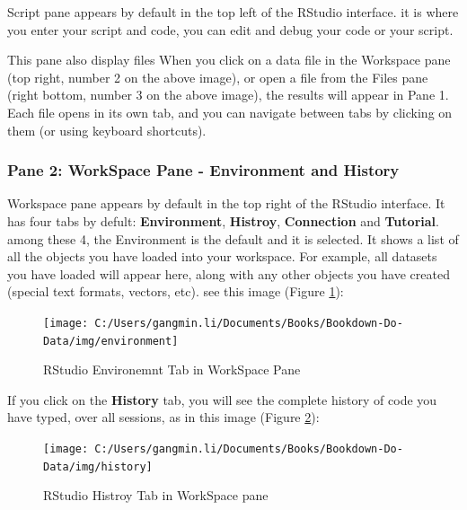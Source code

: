 \documentclass[
]{book}
\begin{document}
Script pane appears by default in the top left of the RStudio interface. it is where you enter your script and code, you can edit and debug your code or your script.

This pane also display files When you click on a data file in the Workspace pane (top right, number 2 on the above image), or open a file from the Files pane (right bottom, number 3 on the above image), the results will appear in Pane 1. Each file opens in its own tab, and you can navigate between tabs by clicking on them (or using keyboard shortcuts).

\hypertarget{pane-2-workspace-pane---environment-and-history}{%
\subsubsection*{Pane 2: WorkSpace Pane - Environment and History}\label{pane-2-workspace-pane---environment-and-history}}


Workspace pane appears by default in the top right of the RStudio interface. It has four tabs by defult: \textbf{Environment}, \textbf{Histroy}, \textbf{Connection} and \textbf{Tutorial}. among these 4, the Environment is the default and it is selected. It shows a list of all the objects you have loaded into your workspace. For example, all datasets you have loaded will appear here, along with any other objects you have created (special text formats, vectors, etc). see this image (Figure \ref{fig:RStudioEven}):

\begin{figure}

{\centering \texttt{[image: C:/Users/gangmin.li/Documents/Books/Bookdown-Do-Data/img/environment]} 

}

\caption{RStudio Environemnt Tab in WorkSpace Pane}\label{fig:RStudioEven}
\end{figure}

If you click on the \textbf{History} tab, you will see the complete history of code you have typed, over all sessions, as in this image (Figure \ref{fig:RStudiohist}):

\begin{figure}

{\centering \texttt{[image: C:/Users/gangmin.li/Documents/Books/Bookdown-Do-Data/img/history]} 

}

\caption{RStudio Histroy Tab in WorkSpace pane}\label{fig:RStudiohist}
\end{figure}
\end{document}
